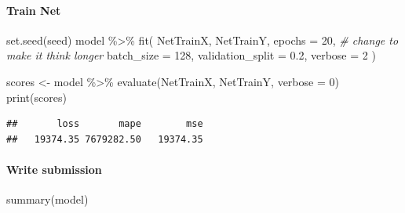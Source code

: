 \documentclass[
]{article}
\newenvironment{Shaded}{\begin{snugshade}}{\end{snugshade}}
\newcommand{\AttributeTok}[1]{\textcolor[rgb]{0.77,0.63,0.00}{#1}}
\newcommand{\CommentTok}[1]{\textcolor[rgb]{0.56,0.35,0.01}{\textit{#1}}}
\newcommand{\DecValTok}[1]{\textcolor[rgb]{0.00,0.00,0.81}{#1}}
\newcommand{\FloatTok}[1]{\textcolor[rgb]{0.00,0.00,0.81}{#1}}
\newcommand{\FunctionTok}[1]{\textcolor[rgb]{0.00,0.00,0.00}{#1}}
\newcommand{\NormalTok}[1]{#1}
\newcommand{\OtherTok}[1]{\textcolor[rgb]{0.56,0.35,0.01}{#1}}
\newcommand{\SpecialCharTok}[1]{\textcolor[rgb]{0.00,0.00,0.00}{#1}}
\begin{document}
\hypertarget{train-net}{%
\paragraph{Train Net}\label{train-net}}

\begin{Shaded}
\begin{Highlighting}[]
\FunctionTok{set.seed}\NormalTok{(seed)}
\NormalTok{model }\SpecialCharTok{\%\textgreater{}\%} \FunctionTok{fit}\NormalTok{(}
\NormalTok{  NetTrainX,}
\NormalTok{  NetTrainY,}
  \AttributeTok{epochs =} \DecValTok{20}\NormalTok{, }\CommentTok{\# change to make it think longer}
  \AttributeTok{batch\_size =} \DecValTok{128}\NormalTok{,}
  \AttributeTok{validation\_split =} \FloatTok{0.2}\NormalTok{,}
  \AttributeTok{verbose =} \DecValTok{2}
\NormalTok{)}

\NormalTok{scores }\OtherTok{\textless{}{-}}\NormalTok{ model }\SpecialCharTok{\%\textgreater{}\%} \FunctionTok{evaluate}\NormalTok{(NetTrainX, NetTrainY, }\AttributeTok{verbose =} \DecValTok{0}\NormalTok{)}
\FunctionTok{print}\NormalTok{(scores)}
\end{Highlighting}
\end{Shaded}

\begin{verbatim}
##       loss       mape        mse 
##   19374.35 7679282.50   19374.35
\end{verbatim}

\hypertarget{write-submission-1}{%
\paragraph{Write submission}\label{write-submission-1}}

\begin{Shaded}
\begin{Highlighting}[]
\FunctionTok{summary}\NormalTok{(model)}
\end{Highlighting}
\end{Shaded}
\end{document}
